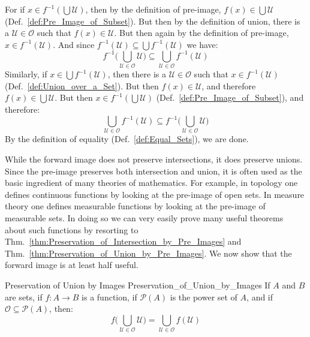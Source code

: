     \begin{bproof}
        For if $x\in{f}^{\minus{1}}(\bigcup\mathcal{U})$, then by the definition
        of pre-image, $f(x)\in\bigcup\mathcal{U}$
        (Def.~\ref{def:Pre_Image_of_Subset}). But then by the definition of
        union, there is a $\mathcal{U}\in\mathcal{O}$ such that
        $f(x)\in\mathcal{U}$. But then again by the definition of pre-image,
        $x\in{f}^{\minus{1}}(\mathcal{U})$. And since
        $f^{\minus{1}}(\mathcal{U})\subseteq\bigcup{f}^{\minus{1}}(\mathcal{U})$
        we have:
        \begin{equation}
            f^{\minus{1}}\Big(
                \bigcup_{\mathcal{U}\in\mathcal{O}}\mathcal{U}\Big)
            \subseteq
            \bigcup_{\mathcal{U}\in\mathcal{O}}f^{\minus{1}}(\mathcal{U})
        \end{equation}
        Similarly, if $x\in\bigcup{f}^{\minus{1}}(\mathcal{U})$, then there is
        a $\mathcal{U}\in\mathcal{O}$ such that
        $x\in{f}^{\minus{1}}(\mathcal{U})$ (Def.~\ref{def:Union_over_a_Set}).
        But then $f(x)\in\mathcal{U}$, and therefore
        $f(x)\in\bigcup\mathcal{U}$. But then
        $x\in{f}^{\minus{1}}(\bigcup\mathcal{U})$
        (Def.~\ref{def:Pre_Image_of_Subset}), and therefore:
        \begin{equation}
            \bigcup_{\mathcal{U}\in\mathcal{O}}f^{\minus{1}}(\mathcal{U})
            \subseteq
            f^{\minus{1}}\Big(
                \bigcup_{\mathcal{U}\in\mathcal{O}}\mathcal{U}\Big)
        \end{equation}
        By the definition of equality (Def.~\ref{def:Equal_Sets}), we are
        done.
    \end{bproof}
    While the forward image does not preserve intersections, it does preserve
    unions. Since the pre-image preserves both intersection and union, it is
    often used as the basic ingredient of many theories of mathematics. For
    example, in topology one defines continuous functions by looking at the
    pre-image of open sets. In measure theory one defines measurable functions
    by looking at the pre-image of measurable sets. In doing so we can very
    easily prove many useful theorems about such functions by resorting to
    Thm.~\ref{thm:Preservation_of_Intersection_by_Pre_Images} and
    Thm.~\ref{thm:Preservation_of_Union_by_Pre_Images}. We now show that the
    forward image is at least half useful.
    \begin{ftheorem}{Preservation of Union by Images}
                    {Preservation_of_Union_by_Images}
        If $A$ and $B$ are sets, if $f:A\rightarrow{B}$ is a function, if
        $\mathcal{P}(A)$ is the power set of $A$, and if
        $\mathcal{O}\subseteq\mathcal{P}(A)$, then:
        \begin{equation*}
            f\Big(\bigcup_{\mathcal{U}\in\mathcal{O}}\mathcal{U}\Big)
            =\bigcup_{\mathcal{U}\in\mathcal{O}}f(\mathcal{U})
        \end{equation*}
    \end{ftheorem}
